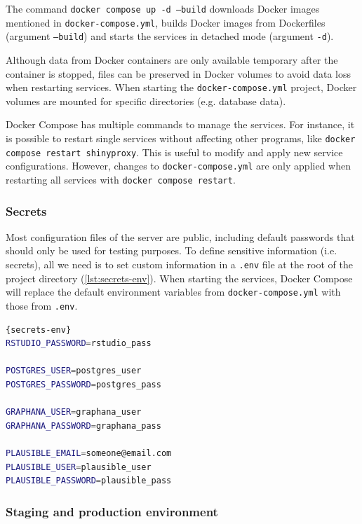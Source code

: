 The command \texttt{docker compose up -d --build} downloads Docker images mentioned in \texttt{docker-compose.yml}, builds Docker images from Dockerfiles (argument \texttt{--build}) and starts the services in detached mode (argument \texttt{-d}).

Although data from Docker containers are only available temporary after the container is stopped, files can be preserved in Docker volumes to avoid data loss when restarting services. When starting the \texttt{docker-compose.yml} project, Docker volumes are mounted for specific directories (e.g. database data).

Docker Compose has multiple commands to manage the services. For instance, it is possible to restart single services without affecting other programs, like \texttt{docker compose restart shinyproxy}. This is useful to modify and apply new service configurations. However, changes to \texttt{docker-compose.yml} are only applied when restarting all services with \texttt{docker compose restart}.


\subsubsection{Secrets}

Most configuration files of the server are public, including default passwords that should only be used for testing purposes. To define sensitive information (i.e. secrets), all we need is to set custom information in a \texttt{.env} file at the root of the project directory (\autoref{lst:secrets-env}). When starting the services, Docker Compose will replace the default environment variables from \texttt{docker-compose.yml} with those from \texttt{.env}.

\begin{lstlisting}[caption=Template of a \texttt{.env} file that defines sensitive data.,language=bash,label={lst:secrets-env}]{secrets-env}
RSTUDIO_PASSWORD=rstudio_pass

POSTGRES_USER=postgres_user
POSTGRES_PASSWORD=postgres_pass

GRAPHANA_USER=graphana_user
GRAPHANA_PASSWORD=graphana_pass

PLAUSIBLE_EMAIL=someone@email.com
PLAUSIBLE_USER=plausible_user
PLAUSIBLE_PASSWORD=plausible_pass
\end{lstlisting}

\subsubsection{Staging and production environment}

